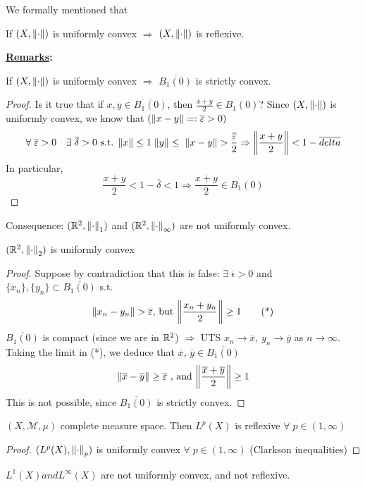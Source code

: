 We formally mentioned that
\begin{theorem}
    If \((X, \norm{\cdot})\) is uniformly convex \(\Rightarrow\) \((X, \norm{\cdot})\) is reflexive.
\end{theorem}

\noindent\textbf{\underline{Remarks}:}
    \begin{proposition}
        If \((X, \norm{\cdot})\) is uniformly convex \(\Rightarrow\) \(\overline{B_1(0)}\) is strictly convex.
    \end{proposition}
    \begin{proof}
        Is it true that if \(x, y \in \overline{B_1(0)}\), then \(\frac{x+y}{2} \in B_1(0)\)? Since \((X, \norm{\cdot})\) is uniformly convex, we know that \((\norm{x-y}=: \overline{\varepsilon}>0)\)
        \[
            \forall \; \overline{\varepsilon}>0 \quad \exists \; \overline{\delta} >0 \text{ s.t. } \norm{x} \leq 1 \; \norm{y} \leq \; \norm{x-y} > \frac{\overline{\varepsilon}}{2} \Rightarrow \norm{\frac{x+y}{2}} < 1-\overline{delta} 
        \]
        In particular, 
        \[
            \frac{x+y}{2} < 1-\overline{\delta} < 1 \Rightarrow \frac{x+y}{2} \in B_1(0)
        \] 
    \end{proof}
    Consequence: \((\mathbb{R}^2, \norm{\cdot}_1)\) and \((\mathbb{R}^2, \norm{\cdot}_\infty)\) are not uniformly convex.
\begin{proposition}
    \((\mathbb{R}^2, \norm{\cdot}_2)\) is uniformly convex
\end{proposition}
\begin{proof}
    Suppose by contradiction that this is false:
    \( \exists \; \overline{\epsilon} >0 \) and \( \{x_n\}, \{y_n\} \subset \overline{B_1(0)} \) s.t. 
    \[
        \norm{x_n - y_n} > \overline{\varepsilon} \text{, but } \norm{\frac{x_n + y_n}{2}} \geq 1 \tag{*}
    \]
    \(\overline{B_1(0)}\) is compact (since we are in \(\mathbb{R}^2\)) \(\Rightarrow\) UTS \(x_n \to \overline{x} \), \(y_n \to \overline{y}\) as \(n \to\infty\). Taking the limit in (*), we deduce that \(\overline{x}\), \(\overline{y} \in \overline{B_1(0)}\)
    \[
        \norm{\overline{x}- \overline{y}} \geq \overline{\varepsilon} \text{ , and } \norm{\frac{\overline{x}+\overline{y}}{2}} \geq 1
    \]
    This is not possible, since \(\overline{B_1(0)}\) is strictly convex.
\end{proof}

\begin{theorem}
    \((X, \mathcal{M}, \mu)\) complete measure space. Then \(L^{p}(X)\) is reflexive \(\forall \; p \in (1, \infty)\)
\end{theorem}
\begin{proof}
    \((L^p(X), \norm{\cdot}_p)\) is uniformly convex \(\forall \; p \in (1, \infty)\) (Clarkson inequalities)
\end{proof}
\(L^1(X) and L^\infty(X)\) are not uniformly convex, and not reflexive.


